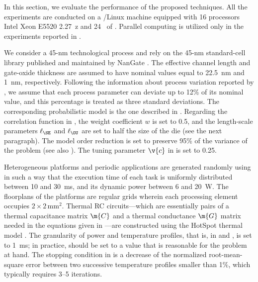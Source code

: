 In this section, we evaluate the performance of the proposed techniques. All the
experiments are conducted on a /Linux machine equipped with 16
processors Intel Xeon E5520 2.27~z and 24~ of . Parallel
computing is utilized only in the experiments reported in
.


We consider a 45-nm technological process and rely on the 45-nm standard-cell
library published and maintained by NanGate \cite{nangate}. The effective
channel length and gate-oxide thickness are assumed to have nominal values equal
to 22.5~nm and 1~nm, respectively. Following the information about process
variation reported by  \cite{itrs}, we assume that each process
parameter can deviate up to 12\% of its nominal value, and this percentage is
treated as three standard deviations. The corresponding probabilistic model is
the one described in . Regarding the correlation function in
, the weight coefficient $w$ is set to 0.5, and the
length-scale parameters $\ell_\SE$ and $\ell_\OU$ are set to half the size of
the die (see the next paragraph). The model order reduction is set to preserve
95\% of the variance of the problem (see also ). The
tuning parameter $\v{c}$ in  is set to 0.25.

Heterogeneous platforms and periodic applications are generated randomly using
 \cite{dick1998} in such a way that the execution time of each task is
uniformly distributed between 10 and 30~ms, and its dynamic power between 6 and
20~W. The floorplans of the platforms are regular grids wherein each processing
element occupies $2 \times 2\,\text{mm}^2$. Thermal RC circuits---which are
essentially pairs of a thermal capacitance matrix $\m{C}$ and a thermal
conductance $\m{G}$ matrix needed in the equations given in
---are constructed using the HotSpot thermal model
\cite{skadron2004}. The granularity of power and temperature profiles, that is,
\dt in  and , is set to
1~ms; in practice, \dt should be set to a value that is reasonable for the
problem at hand. The stopping condition in  is a
decrease of the normalized root-mean-square error between two successive
temperature profiles smaller than 1\%, which typically requires 3--5 iterations.

